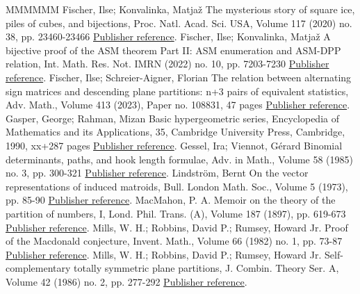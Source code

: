 \documentclass[11pt]{article}
\theoremstyle{definition}
\numberwithin{equation}{section}
\newcounter{x}
\newcounter{y}
\newcounter{z}
\begin{document}
\begin{thebibliography}{MMMMMM}
 Fischer, Ilse; Konvalinka, Matjaž The mysterious story of square ice, piles of cubes, and bijections, Proc. Natl. Acad. Sci. USA, Volume 117 (2020) no. 38, pp. 23460-23466 \href{https://alco.centre-mersenne.org/articles/10.5802/alco.374/#cube}{Publisher reference}.
 Fischer, Ilse; Konvalinka, Matjaž A bijective proof of the ASM theorem Part II: ASM enumeration and ASM-DPP relation, Int. Math. Res. Not. IMRN (2022) no. 10, pp. 7203-7230 \href{https://alco.centre-mersenne.org/articles/10.5802/alco.374/#FischerKonvalinka20plus}{Publisher reference}.
 Fischer, Ilse; Schreier-Aigner, Florian The relation between alternating sign matrices and descending plane partitions: n+3 pairs of equivalent statistics, Adv. Math., Volume 413 (2023), Paper no. 108831, 47 pages \href{https://alco.centre-mersenne.org/articles/10.5802/alco.374/#FischerSchreierAigner23}{Publisher reference}.
 Gasper, George; Rahman, Mizan Basic hypergeometric series, Encyclopedia of Mathematics and its Applications, 35, Cambridge University Press, Cambridge, 1990, xx+287 pages \href{https://alco.centre-mersenne.org/articles/10.5802/alco.374/#GasperRahman90}{Publisher reference}.
 Gessel, Ira; Viennot, Gérard Binomial determinants, paths, and hook length formulae, Adv. in Math., Volume 58 (1985) no. 3, pp. 300-321 \href{https://alco.centre-mersenne.org/articles/10.5802/alco.374/#GesselViennot85}{Publisher reference}.
 Lindström, Bernt On the vector representations of induced matroids, Bull. London Math. Soc., Volume 5 (1973), pp. 85-90 \href{https://alco.centre-mersenne.org/articles/10.5802/alco.374/#Lindstroem73}{Publisher reference}.
 MacMahon, P. A. Memoir on the theory of the partition of numbers, I, Lond. Phil. Trans. (A), Volume 187 (1897), pp. 619-673 \href{https://alco.centre-mersenne.org/articles/10.5802/alco.374/#MacMahon97}{Publisher reference}.
 Mills, W. H.; Robbins, David P.; Rumsey, Howard Jr. Proof of the Macdonald conjecture, Invent. Math., Volume 66 (1982) no. 1, pp. 73-87 \href{https://alco.centre-mersenne.org/articles/10.5802/alco.374/#MillsRobbinsRumsey82}{Publisher reference}.
 Mills, W. H.; Robbins, David P.; Rumsey, Howard Jr. Self-complementary totally symmetric plane partitions, J. Combin. Theory Ser. A, Volume 42 (1986) no. 2, pp. 277-292 \href{https://alco.centre-mersenne.org/articles/10.5802/alco.374/#MillsRobbinsRumsey86}{Publisher reference}.

\end{thebibliography}
\end{document}
